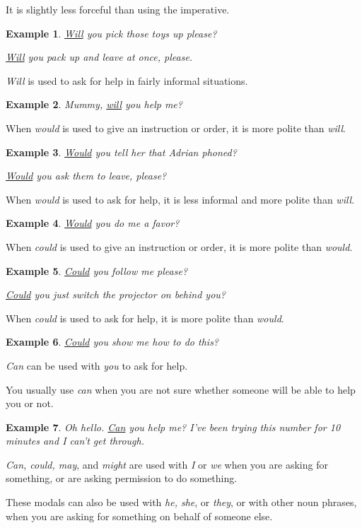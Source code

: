 \documentclass[oneside]{book}
\numberwithin{equation}{section}
\newtheorem{example}{Example}[section]
\begin{document}
It is slightly less forceful than using the imperative.
\begin{example}
    \underline{Will} you pick those toys up please?
    
    \underline{Will} you pack up and leave at once, please.
\end{example}
\textit{Will} is used to ask for help in fairly informal situations.
\begin{example}
    Mummy, \underline{will} you help me?
\end{example}
%
\noindent{} When \textit{would} is used to give an instruction or order, it is more polite than \textit{will}.
\begin{example}
    \underline{Would} you tell her that Adrian phoned?
    
    \underline{Would} you ask them to leave, please?
\end{example}
When \textit{would} is used to ask for help, it is less informal and more polite than \textit{will}.
\begin{example}
    \underline{Would} you do me a favor?
\end{example}
%
\noindent{} When \textit{could} is used to give an instruction or order, it is more polite than \textit{would}.
\begin{example}
    \underline{Could} you follow me please?
    
    \underline{Could} you just switch the projector on behind you?
\end{example}
When \textit{could} is used to ask for help, it is more polite than \textit{would}.
\begin{example}
    \underline{Could} you show me how to do this?
\end{example}
%
\noindent{} \textit{Can} can be used with \textit{you} to ask for help.

You usually use \textit{can} when you are not sure whether someone will be able to help you or not.
\begin{example}
    Oh hello. \underline{Can} you help me? I've been trying this number for 10 minutes and I can't get through.
\end{example}
%
\noindent{} \textit{Can, could, may}, and \textit{might} are used with \textit{I} or \textit{we} when you are asking for something, or are asking permission to do something.

%
These modals can also be used with \textit{he, she}, or \textit{they}, or with other noun phrases, when you are asking for something on behalf of someone else.
\end{document}
